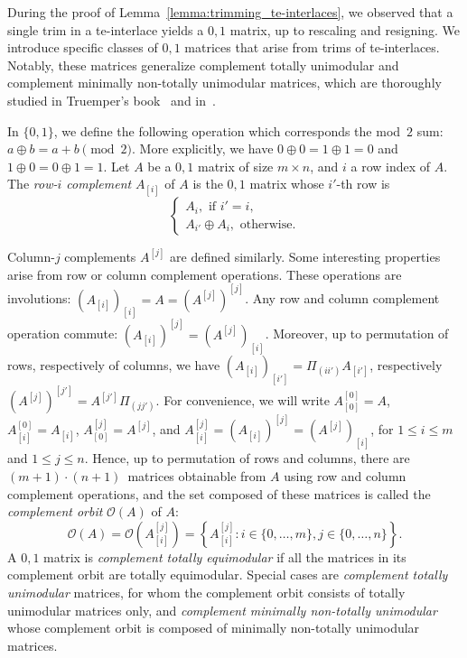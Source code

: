 \documentclass[11pt,a4paper]{amsart}
\renewcommand*{\leq}{\leqslant}
\theoremstyle{plain}
\theoremstyle{definition}
\newcommand{\cal}[1]{\mathcal{#1}}
\renewcommand{\cal}[1]{\mathcal{#1}}
\begin{document}
During the proof of Lemma~\ref{lemma:trimming_te-interlaces}, we observed that a single trim in a te-interlace yields a $0,\!1$ matrix, up to rescaling and resigning.
We introduce specific classes of $0,\!1$ matrices that arise from trims of te-interlaces. 
Notably, these matrices generalize complement totally unimodular and complement minimally non-totally unimodular matrices, which are thoroughly studied in Truemper's book~\cite{Truemper_1992} and in~\cite{Truemper_1980}.

In $\{0,1\}$, we define the following operation which corresponds the mod~$2$ sum: $a\oplus b=a+b\pmod{2}$.
More explicitly, we have $0\oplus0 =1\oplus1=0$ and $1\oplus 0=0\oplus 1=1$.
Let $A$ be a $0,\!1$ matrix of size $m\times n$, and $i$ a row index of $A$.
The \emph{row-$i$ complement} $A_{[i]}$ of $A$ is the $0,\!1$ matrix whose $i'$-th row is $$\begin{cases}
A_{i}, \text{ if }i'=i,\\
A_{i'}\oplus A_i, \text{ otherwise}.
\end{cases}$$

Column-$j$ complements $A^{[j]}$ are defined similarly.
Some interesting properties arise from row or column complement operations.
These operations are involutions: $(A_{[i]})_{[i]}=A=(A^{[j]})^{[j]}$.
Any row and column complement operation commute: $(A_{[i]})^{[j]}=(A^{[j]})_{[i]}$.
Moreover, up to permutation of rows, respectively of columns, we have $(A_{[i]})_{[i']} = \Pi_{(ii')} A_{[i']} $, respectively $(A^{[j]})^{[j']} = A^{[j']} \Pi_{(jj')}$.
For convenience, we will write $A^{[0]}_{[0]}=A$, $A^{[0]}_{[i]} = A_{[i]}$, $A^{[j]}_{[0]}=A^{[j]}$, and $A^{[j]}_{[i]}=(A_{[i]})^{[j]}=(A^{[j]})_{[i]}$, for $1\leq i \leq m$ and $1\leq j\leq n$.
Hence, up to permutation of rows and columns, there are $(m+1)\cdot(n+1)$~matrices obtainable from $A$ using row and column complement operations, and the set composed of these matrices is called the \emph{complement orbit} $\cal O (A)$ of $A$:
$$\cal O (A) = \cal O (A^{[j]}_{[i]}) = \left\{A^{[j]}_{[i]}\colon i\in\{0,\ldots,m\},j\in\{0,\ldots,n\}\right\}.$$
A $0,\!1$ matrix is \emph{complement totally equimodular} if all the matrices in its complement orbit are totally equimodular.
Special cases are \emph{complement totally unimodular} matrices, for whom the complement orbit consists of totally unimodular matrices only, and \emph{complement minimally non-totally unimodular} whose complement orbit is composed of minimally non-totally unimodular matrices.
\medskip
\end{document}
